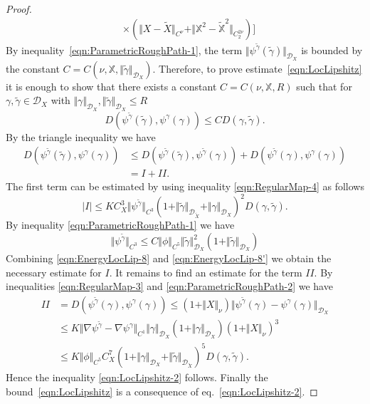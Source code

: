 \documentclass[11pt,a4paper,reqno]{amsart}%
\theoremstyle{plain}
\theoremstyle{remark}
\theoremstyle{plain}
\numberwithin{equation}{section}
\begin{document}
\begin{proof}
\begin{align*}
&\times(\Vert X-\tilde{X}\Vert_{C^{\nu}}+\Vert \mathbb{X}^2-\mathbb{\tilde{X}}^2\Vert_{C_2^{2\nu}})\Big]
\end{align*}
By
inequality~\eqref{eqn:ParametricRoughPath-1}, the term $\Vert \psi^{\tilde{\gamma}}(\tilde{\gamma})\Vert_{\mathcal{D}_X}$ is
bounded by the constant
$C=C(\nu,\mathbb{X},\Vert \tilde{\gamma}\Vert_{\mathcal{D}_X})$. Therefore, to prove
estimate~\eqref{eqn:LocLipshitz} it is enough to show that there
exists a constant $C=C(\nu,\mathbb{X},R)$ such that for
$\gamma,\tilde{\gamma}\in\mathcal{D}_X$ with
$\Vert \gamma\Vert_{\mathcal{D}_X},\Vert \tilde{\gamma}\Vert_{\mathcal{D}_X}\leq R$
\begin{equation}
D( \psi^{\tilde{\gamma}}(\tilde{\gamma}), \psi^{\gamma}(\gamma)) \leq
CD( \gamma,\tilde{\gamma}).\label{eqn:EnergyLocLip-6}
\end{equation}
By the triangle inequality we have
\begin{align}
D( \psi^{\tilde{\gamma}}(\tilde{\gamma}), \psi^{\gamma}(\gamma))
&\leq D( \psi^{\tilde{\gamma}}(\tilde{\gamma}), \psi^{\tilde{\gamma}}(\gamma)) + D( \psi^{\tilde{\gamma}}({\gamma}), \psi^{\gamma}(\gamma))
\nonumber\\
&=I+II.\label{eqn:EnergyLocLip-7}
\end{align}
The first term can be estimated by using inequality
\eqref{eqn:RegularMap-4} as follows
\begin{equation}
\vert I\vert \leq
KC_X^3\Vert \psi^{\tilde{\gamma}}\Vert_{C^3}(1+\Vert \tilde{\gamma}\Vert_{\mathcal{D}_{\tilde{X}}}+
\Vert \gamma\Vert_{\mathcal{D}_X})^2 D( \gamma,\tilde{\gamma}).\label{eqn:EnergyLocLip-8}
\end{equation}
By inequality \eqref{eqn:ParametricRoughPath-1} we have
\begin{equation}
\Vert \psi^{\tilde{\gamma}}\Vert_{C^3}\leq
C\Vert \phi\Vert_{C^5}\Vert \tilde{\gamma}\Vert_{\mathcal{D}_X}^2(1+\Vert \tilde{\gamma}\Vert_{\mathcal{D}_X})\label{eqn:EnergyLocLip-8'}
\end{equation}
Combining \eqref{eqn:EnergyLocLip-8} and
\eqref{eqn:EnergyLocLip-8'} we obtain the necessary estimate for $I$. It
remains to find an estimate for the term $II$. By inequalities
\eqref{eqn:RegularMap-3} and \eqref{eqn:ParametricRoughPath-2} we
have
\begin{align}
II&=D( \psi^{\tilde{\gamma}}({\gamma}), \psi^{\gamma}(\gamma))
\leq
(1+\Vert X\Vert_{\nu})\Vert \psi^{\tilde{\gamma}}(\gamma)-\psi^{\gamma}(\gamma)\Vert_{\mathcal{D}_X}\nonumber\\
&\leq K\Vert \nabla\psi^{\tilde{\gamma}}-\nabla\psi^{\gamma}\Vert_{C^1}
\Vert \gamma\Vert_{\mathcal{D}_X}(1+\Vert \gamma\Vert_{\mathcal{D}_X})(1+\Vert X\Vert_{\nu})^3
\nonumber\\
&\leq K\Vert \phi\Vert_{C^5}C_X^7(1+\Vert \gamma\Vert_{\mathcal{D}_X}+\Vert \tilde{\gamma}\Vert_{\mathcal{D}_{\tilde{X}}})^5
D( \gamma,\tilde{\gamma}).\label{eqn:EnergyLocLip-9}
\end{align}
Hence the inequality \eqref{eqn:LocLipshitz-2} follows. Finally the bound~\eqref{eqn:LocLipshitz} is a consequence of eq.~\eqref{eqn:LocLipshitz-2}.
\end{proof}
\end{document}
